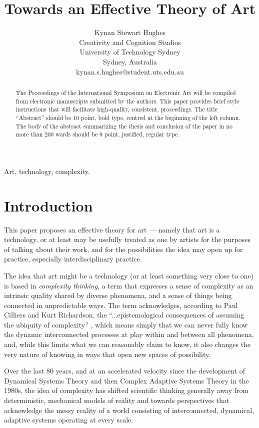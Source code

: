 \documentclass[letterpaper]{article}
\title{Towards an Effective Theory of Art}
\author{Kynan Stewart Hughes\\
Creativity and Cognition Studios\\
University of Technology Sydney\\
Sydney, Australia\\
kynan.s.hughes@student.uts.edu.au\\
\newline
\newline
}
\begin{document}
 
\maketitle
\begin{abstract}
The Proceedings of the International Symposium on Electronic
Art will be compiled from electronic manuscripts submitted by
the authors. This paper provides brief style instructions that will
facilitate high-quality, consistent, proceedings. The title
``Abstract'' should be 10 point, bold type, centred at the
beginning of the left column. The body of the abstract
summarizing the thesis and conclusion of the paper in no more
than 200 words should be 9 point, justified, regular type.
\end{abstract}


Art, technology, complexity.

\section{Introduction}

    This paper proposes an effective theory for art — namely that art is a technology, or at least may be usefully treated as one by artists for the purposes of talking about their work, and for the possibilities the idea may open up for practice, especially interdisciplinary practice.
    
    The idea that art might be a technology (or at least something very close to one) is based in \emph{complexity thinking}, a term that expresses a sense of complexity as an intrinsic quality shared by diverse phenomena, and a sense of things being connected in unpredictable ways. The term acknowledges, according to Paul Cilliers and Kurt Richardson, the “...epistemological consequences of assuming the ubiquity of complexity” \citep{CilliersRichardsonCmplxtyScnc2001}, which means simply that we can never fully know the dynamic interconnected processes at play within and between all phenomena, and, while this limits what we can reasonably claim to know, it also changes the very nature of knowing in ways that open new spaces of possibility. 

    Over the last 80 years, and at an accelerated velocity since the development of Dynamical Systems Theory and then Complex Adaptive Systems Theory in the 1980s, the idea of complexity has shifted scientific thinking generally away from deterministic, mechanical models of reality and towards perspectives that acknowledge the messy reality of a world consisting of interconnected, dynamical, adaptive systems operating at every scale.
    
\end{document}
